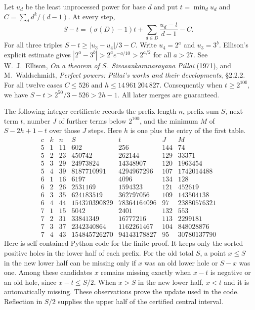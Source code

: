 \documentclass[11pt]{article}
\begin{document}
Let $u_d$ be the least unprocessed power for base $d$ and put
$t=\min_d u_d$ and $C=\sum_d d^k/(d-1)$. At every step,
\[
 S-t=(\sigma(D)-1)t+\sum_{d\in D}\frac{u_d-t}{d-1}-C .
\]
For all three triples $S-t\ge |u_3-u_4|/3-C$.
Write $u_4=2^a$ and $u_3=3^b$. Ellison's explicit estimate gives
$|2^a-3^b|>2^a e^{-a/10}>2^{a/2}$ for all $a>27$.
See W.~J.~Ellison, \emph{On a theorem of S.~Sivasankaranarayana Pillai}
(1971), and M.~Waldschmidt, \emph{Perfect powers: Pillai's works and
their developments}, \S2.2.2. For all twelve cases $C\le526$
and $h\le14\,961\,204\,827$. Consequently when $t\ge2^{100}$,
we have $S-t>2^{50}/3-526>2h-1$. All later merges are guaranteed.

The following integer certificate records the prefix length $n$,
prefix sum $S$, next term $t$, number $J$ of further terms below
$2^{100}$, and the minimum $M$ of $S-2h+1-t$ over those $J$ steps.
Here $h$ is one plus the entry of the first table.
\[
\begin{array}{rr|r|r|r|r|r}
 c&k&n&S&t&J&M\\ \hline
5&1&11&602&256&144&74\\
5&2&23&450742&262144&129&33371\\
5&3&29&24973824&14348907&120&1963454\\
5&4&39&8187710991&4294967296&107&1742014488\\
6&1&16&6197&4096&134&128\\
6&2&26&2531169&1594323&121&452619\\
6&3&35&624183519&362797056&109&143504138\\
6&4&44&154370390829&78364164096&97&23880576321\\
7&1&15&5042&2401&132&553\\
7&2&31&33841349&16777216&113&2299181\\
7&3&37&2342340864&1162261467&104&848028876\\
7&4&43&154845726270&94143178827&95&30780137790
\end{array}
\]
Here is self-contained Python code for the finite proof. It keeps
only the sorted positive holes in the lower half of each prefix.
For the old total $S$, a point $x\le S$ in the new lower
half can be missing only if $x$ was an old lower hole or $S-x$ was
one. Among these candidates $x$ remains missing exactly when $x-t$
is negative or an old hole, since $x-t\le S/2$. When $x>S$ in
the new lower half, $x<t$ and it is automatically missing. These
observations prove the update used in the code. Reflection in $S/2$
supplies the upper half of the certified central interval.
\end{document}
